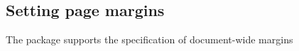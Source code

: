 %

\subsection{Setting page margins}
\begin{frame}
	\begin{block}{The  package}
		supports the specification of document-wide margins
	\end{block}
\end{frame}
\begin{frame}
\end{frame}

